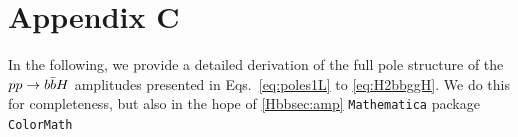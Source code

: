 \documentclass[main.tex]{subfiles}
\begin{document}
\renewcommand{\chaptername}{}
\renewcommand{\thechapter}{}
\renewcommand{\thetable}{C.\arabic{table}}
\renewcommand{\thesection}{C.\arabic{section}}
\renewcommand{\thesubsection}{C.\arabic{subsection}}
\renewcommand{\theequation}{C.\arabic{section}.\arabic{equation}}
\chapter{Appendix C} \label{app:polestructure}
In the following, we provide a detailed derivation of the full pole structure of the $pp \rightarrow b\bar{b}H$ amplitudes presented in Eqs.~\ref{eq:poles1L} to \ref{eq:H2bbggH}. We do this for completeness, but also in the hope of 
\ref{Hbbsec:amp}
\texttt{Mathematica} package \texttt{ColorMath}~\cite{Sjodahl:2012nk}
\end{document}
